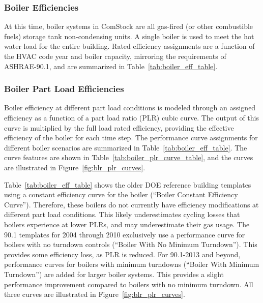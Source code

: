 \subsubsection{Boiler Efficiencies}
At this time, boiler systems in ComStock are all gas-fired (or other combustible fuels) storage tank non-condensing units. A single boiler is used to meet the hot water load for the entire building. Rated efficiency assignments are a function of the HVAC code year and boiler capacity, mirroring the requirements of ASHRAE-90.1, and are summarized in Table~\ref{tab:boiler_eff_table}.

\subsubsection{Boiler Part Load Efficiencies}
Boiler efficiency at different part load conditions is modeled through an assigned efficiency as a function of a part load ratio (PLR) cubic curve. The output of this curve is multiplied by the full load rated efficiency, providing the effective efficiency of the boiler for each time step. The performance curve assignments for different boiler scenarios are summarized in Table~\ref{tab:boiler_eff_table}. The curve features are shown in Table~\ref{tab:boiler_plr_curve_table}, and the curves are illustrated in Figure~\ref{fig:blr_plr_curves}.

Table~\ref{tab:boiler_eff_table} shows the older DOE reference building templates using a constant efficiency curve for the boiler (``Boiler Constant Efficiency Curve''). Therefore, these boilers do not currently have efficiency modifications at different part load conditions. This likely underestimates cycling losses that boilers experience at lower PLRs, and may underestimate their gas usage. The 90.1 templates for 2004 through 2010 exclusively use a performance curve for boilers with no turndown controls (``Boiler With No Minimum Turndown''). This provides some efficiency loss, as PLR is reduced. For 90.1-2013 and beyond, performance curves for boilers with minimum turndowns (``Boiler With Minimum Turndown'') are added for larger boiler systems. This provides a slight performance improvement compared to boilers with no minimum turndown. All three curves are illustrated in Figure~\ref{fig:blr_plr_curves}.




